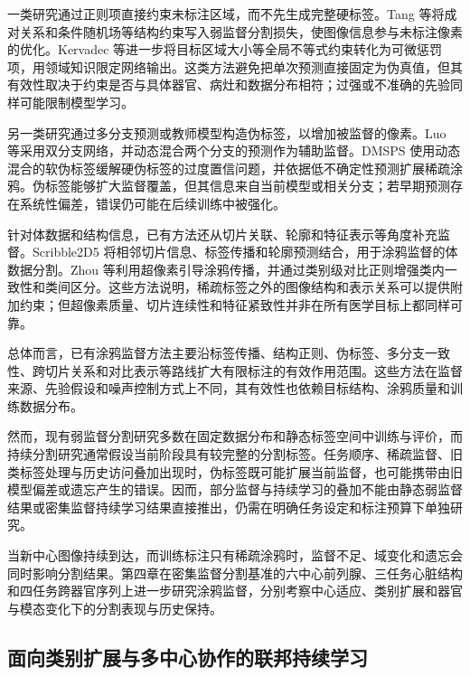一类研究通过正则项直接约束未标注区域，而不先生成完整硬标签。Tang 等将成对关系和条件随机场等结构约束写入弱监督分割损失，使图像信息参与未标注像素的优化\cite{tang2018regularized}。Kervadec 等进一步将目标区域大小等全局不等式约束转化为可微惩罚项，用领域知识限定网络输出\cite{kervadec2019constrained}。这类方法避免把单次预测直接固定为伪真值，但其有效性取决于约束是否与具体器官、病灶和数据分布相符；过强或不准确的先验同样可能限制模型学习。

另一类研究通过多分支预测或教师模型构造伪标签，以增加被监督的像素。Luo 等采用双分支网络，并动态混合两个分支的预测作为辅助监督\cite{luo2022scribble}。DMSPS 使用动态混合的软伪标签缓解硬伪标签的过度置信问题，并依据低不确定性预测扩展稀疏涂鸦\cite{han2024dmsps}。伪标签能够扩大监督覆盖，但其信息来自当前模型或相关分支；若早期预测存在系统性偏差，错误仍可能在后续训练中被强化。

针对体数据和结构信息，已有方法还从切片关联、轮廓和特征表示等角度补充监督。Scribble2D5 将相邻切片信息、标签传播和轮廓预测结合，用于涂鸦监督的体数据分割\cite{chen2022scribble2d5}。Zhou 等利用超像素引导涂鸦传播，并通过类别级对比正则增强类内一致性和类间区分\cite{zhou2023scribblewalking}。这些方法说明，稀疏标签之外的图像结构和表示关系可以提供附加约束；但超像素质量、切片连续性和特征紧致性并非在所有医学目标上都同样可靠。

总体而言，已有涂鸦监督方法主要沿标签传播、结构正则、伪标签、多分支一致性、跨切片关系和对比表示等路线扩大有限标注的有效作用范围\cite{lin2016scribblesup,tang2018regularized,kervadec2019constrained,luo2022scribble,han2024dmsps,chen2022scribble2d5,zhou2023scribblewalking}。这些方法在监督来源、先验假设和噪声控制方式上不同，其有效性也依赖目标结构、涂鸦质量和训练数据分布。

然而，现有弱监督分割研究多数在固定数据分布和静态标签空间中训练与评价，而持续分割研究通常假设当前阶段具有较完整的分割标签。任务顺序、稀疏监督、旧类标签处理与历史访问叠加出现时，伪标签既可能扩展当前监督，也可能携带由旧模型偏差或遗忘产生的错误。因而，部分监督与持续学习的叠加不能由静态弱监督结果或密集监督持续学习结果直接推出，仍需在明确任务设定和标注预算下单独研究。


当新中心图像持续到达，而训练标注只有稀疏涂鸦时，监督不足、域变化和遗忘会同时影响分割结果。第四章在密集监督分割基准的六中心前列腺、三任务心脏结构和四任务跨器官序列上进一步研究涂鸦监督，分别考察中心适应、类别扩展和器官与模态变化下的分割表现与历史保持。

\subsection{面向类别扩展与多中心协作的联邦持续学习}
\label{subsec:intro-federated-continual-learning}

